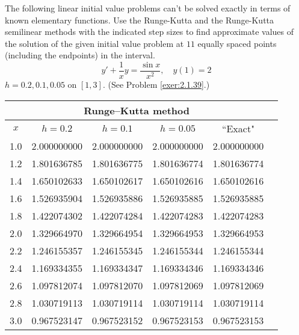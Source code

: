 \documentclass{ximera}
\begin{document}
\begin{problem}\label{exer:3.3.16} The following linear initial value problems can't be solved exactly in terms of known elementary functions. Use the Runge-Kutta and the Runge-Kutta semilinear methods with the
indicated step sizes to find approximate values of the solution of the given initial value problem at $11$ equally spaced points (including the endpoints) in the interval.
$$y'+\frac{1}{x}y=\frac{\sin x}{x^2},\quad y(1)=2$$
$h=0.2,0.1,0.05$ on $[1,3]$.
(See Problem \ref{exer:2.1.39}.)

\begin{solution}
    {\small
\begin{tabular}{|c|r|r|r|r|r|}
\hline
\multicolumn{5}{|c|}{Runge--Kutta method}\\\hline
\multicolumn{1}{|c|}{$x$}&
\multicolumn{1}{|c|}{$h=0.2$}&
\multicolumn{1}{|c|}{$h=0.1$}&
\multicolumn{1}{|c|}{$h=0.05$}&
\multicolumn{1}{|c|}{``Exact"}\\ \hline
1.0 & 2.000000000 & 2.000000000 & 2.000000000 & 2.000000000 \\
1.2 & 1.801636785 & 1.801636775 & 1.801636774 & 1.801636774 \\
1.4 & 1.650102633 & 1.650102617 & 1.650102616 & 1.650102616 \\
1.6 & 1.526935904 & 1.526935886 & 1.526935885 & 1.526935885 \\
1.8 & 1.422074302 & 1.422074284 & 1.422074283 & 1.422074283 \\
2.0 & 1.329664970 & 1.329664954 & 1.329664953 & 1.329664953 \\
2.2 & 1.246155357 & 1.246155345 & 1.246155344 & 1.246155344 \\
2.4 & 1.169334355 & 1.169334347 & 1.169334346 & 1.169334346 \\
2.6 & 1.097812074 & 1.097812070 & 1.097812069 & 1.097812069 \\
2.8 & 1.030719113 & 1.030719114 & 1.030719114 & 1.030719114 \\
3.0 & 0.967523147 & 0.967523152 & 0.967523153 & 0.967523153 \\
\hline
\end{tabular}}


\end{solution}
\end{problem}
\end{document}
